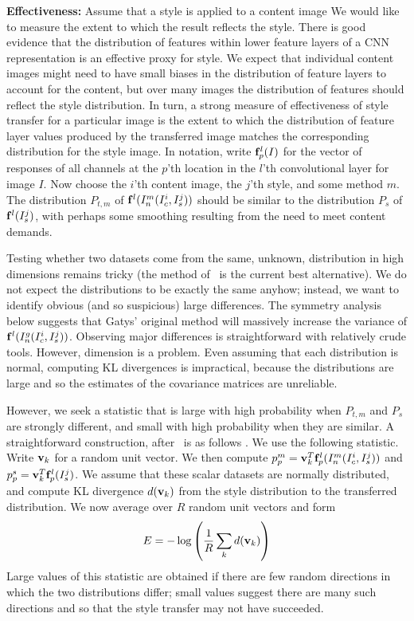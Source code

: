 \documentclass[runningheads]{llncs}
\newcommand{\vect}[1]{{\bf {#1}}}
\begin{document}
{\bf Effectiveness:}  Assume that a style is applied to a content
image  We would like to measure the extent to which the result reflects the style.  There is good evidence that 
the distribution of features within lower feature layers of a CNN representation is an effective proxy for style.  We
expect that individual content images might need to have small biases in the distribution of feature layers to account
for the content, but over many images the distribution of features should reflect the style distribution.  In turn, a
strong measure of effectiveness of style transfer for a particular image is the extent to which the distribution of
feature layer values produced by the transferred image matches the corresponding distribution for the style image.
In notation, write $\vect{f}^{l}_{p}(I)$ for the vector of responses  of all channels  at the  $p$'th location in the $l$'th
convolutional layer for image $I$.   Now choose the $i$'th content image, the $j$'th style, and some method $m$.  The
distribution $P_{t, m}$ of $\vect{f}^{l}(I^m_n(I_c^i,I_s^j))$ should be similar to  the distribution $P_s$ of
$\vect{f}^{l}(I_s^j)$, with perhaps some smoothing  resulting from the need to meet content demands.   

Testing whether two datasets come from the same, unknown, distribution in high dimensions remains tricky (the method
of~\cite{gretton} is the current best alternative).  We do not expect the distributions to be exactly the same anyhow;
instead, we want to identify obvious (and so suspicious) large  differences. The symmetry analysis below suggests that
Gatys' original method will massively increase the variance of  $\vect{f}^{l}(I^g_n(I_c^i,I_s^j))$.  Observing major differences is
straightforward with relatively crude tools.   However, dimension is a problem.  Even assuming that each distribution is
normal,  computing KL divergences is impractical, because the distributions are large and so the estimates of the
covariance matrices are unreliable.   

However, we seek a statistic that is large with high probability when $P_{t,m}$ and $P_s$ are strongly different, and 
small with high probability when they are similar.  A straightforward construction, after~\cite{Schwing} is as follows .
We use the following statistic.  Write $\vect{v}_k$ for a random unit vector.  We then compute
$p_p^m=\vect{v}_k^T\vect{f}_p^{l}(I^m_n(I_c^i,I_s^j))$ and $p_p^s=\vect{v}_k^T\vect{f}_p^{l}(I_s^j)$.  We assume that
these scalar datasets are normally distributed, and compute KL divergence $d(\vect{v}_k)$ from the style distribution to the transferred
distribution.  We now average over $R$ random unit vectors and form
\[
E=-\log \left(\frac{1}{R} \sum_k d(\vect{v}_k)\right)
\]
Large values of this statistic are obtained if there are few random directions in which the two distributions differ;
small values suggest there are many such directions and so that the style transfer may not have succeeded.
\end{document}
